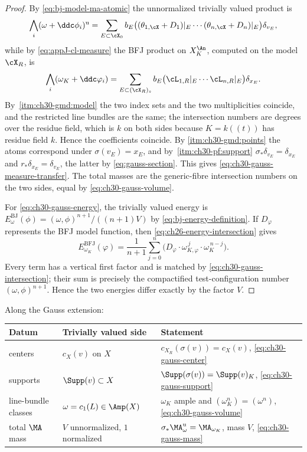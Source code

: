\begin{proof}
By \eqref{eq:bj-model-ma-atomic} the unnormalized trivially valued product
is
\[
 \bigwedge_{i}(\omega+\ddc\phi_i)^{\mathrm u}
 =\sum_{E\subset\cX_0}b_E
   \bigl((\theta_{1,\cX}+D_1)|_E\cdots(\theta_{n,\cX}+D_n)|_E\bigr)
   \delta_{v_E},
\]
while by \eqref{eq:appJ-cl-measure} the BFJ product on $X_K^{\An}$,
computed on the model $\cX_R$, is
\[
 \bigwedge_i(\omega_K+\ddc\varphi_i)
 =\sum_{E\subset(\cX_R)_s}b_E
   \bigl(\cL_{1,R}|_E\cdots\cL_{n,R}|_E\bigr)\delta_{x_E}.
\]
By \,\cref{itm:ch30-gmd:model} the two
index sets and the two multiplicities coincide, and the restricted line
bundles are the same; the intersection numbers are degrees over the residue
field, which is $k$ on both sides because $K=k(\!(t)\!)$ has residue
field $k$.  Hence the coefficients coincide.  By
\cref{itm:ch30-gmd:points} the atoms correspond under
$\sigma(v_E)=x_E$, and by
\,\cref{itm:ch30-pf:support}
$\sigma_*\delta_{v_E}=\delta_{x_E}$ and
$r_*\delta_{x_E}=\delta_{v_E}$, the latter by
\eqref{eq:gauss-section}.  This gives
\eqref{eq:ch30-gauss-measure-transfer}.  The total masses are the
generic-fibre intersection numbers on the two sides, equal by
\eqref{eq:ch30-gauss-volume}.

For \eqref{eq:ch30-gauss-energy}, the trivially valued energy is
$E^{\mathrm{BJ}}_\omega(\phi)=(\omega,\phi)^{n+1}/((n+1)V)$ by
\eqref{eq:bj-energy-definition}.  If $D_\varphi$ represents the BFJ model
function, then \eqref{eq:ch26-energy-intersection} gives
\[
 E^{\mathrm{BFJ}}_{\omega_K}(\varphi)
 =\frac1{n+1}\sum_{j=0}^n
   \bigl(D_\varphi\cdot\omega_{K,\varphi}^{\,j}
                         \cdot\omega_K^{\,n-j}\bigr).
\]
Every term has a vertical first factor and is matched by
\eqref{eq:ch30-gauss-intersection}; their sum is precisely the compactified
test-configuration number $(\omega,\phi)^{n+1}$.  Hence the two energies
differ exactly by the factor $V$.
\end{proof}

\begin{corollary}
\label{cor:ch30-gauss-four-data}
Along the Gauss extension:
\begin{center}
\small
\begin{tabular}{p{}|p{}|p{}}
\toprule
\textbf{Datum}&\textbf{Trivially valued side}
 &\textbf{Statement}\\
\midrule
centers
 &$c_X(v)$ on $X$
 &$c_{X_R}(\sigma(v))=c_X(v)$,
  \eqref{eq:ch30-gauss-center}\\
supports
 &$\Supp(v)\subset X$
 &$\Supp(\sigma(v))=\Supp(v)_K$,
  \eqref{eq:ch30-gauss-support}\\
line-bundle classes
 &$\omega=c_1(L)\in\Amp(X)$
 &$\omega_K$ ample and
  $(\omega_K^n)=(\omega^n)$,
  \eqref{eq:ch30-gauss-volume}\\
total $\MA$ mass
 &$V$ unnormalized, $1$ normalized
 &$\sigma_*\MA^{\mathrm u}_\omega=\MA_{\omega_K}$, mass $V$,
  \eqref{eq:ch30-gauss-mass}\\
\bottomrule
\end{tabular}
\end{center}
\end{corollary}


